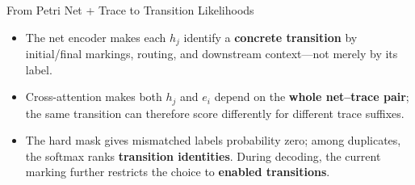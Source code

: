\documentclass[aspectratio=169]{beamer}
\newcommand{\keyc}[1]{\textbf{\textcolor{larablue}{#1}}}
\newcommand{\keyg}[1]{\textbf{\textcolor{laraaqua!70!black}{#1}}}
\begin{document}
\begin{frame}{From Petri Net + Trace to Transition Likelihoods}
\begin{center}
{}
  \end{center}
  \vspace{0.5mm}
  \small
  \begin{itemize}\setlength{\itemsep}{2pt}
    \item The net encoder makes each $h_j$ identify a \keyc{concrete transition}
      by initial/final markings, routing, and downstream context---not merely
      by its label.
    \item Cross-attention makes both $h_j$ and $e_i$ depend on the \keyc{whole
      net--trace pair}; the same transition can therefore score differently for
      different trace suffixes.
    \item The hard mask gives mismatched labels probability zero; among
      duplicates, the softmax ranks \keyc{transition identities}. During decoding,
      the current marking further restricts the choice to \keyg{enabled transitions}.
  \end{itemize}
\end{frame}
\end{document}
